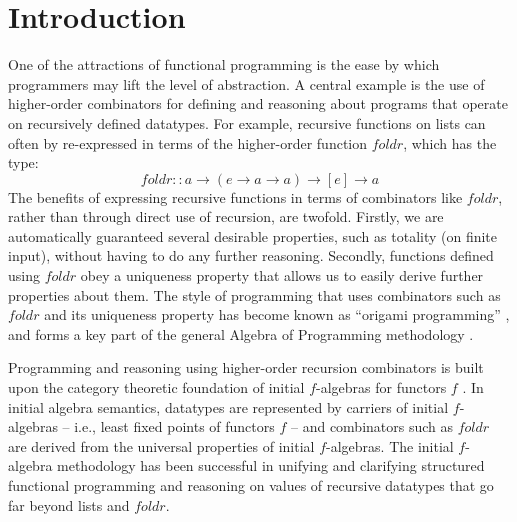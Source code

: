\documentclass{jfp1}
\begin{document}
\section{Introduction}

One of the attractions of functional programming is the ease by which
programmers may lift the level of abstraction. A central example is
the use of higher-order combinators for defining and reasoning about
programs that operate on recursively defined datatypes. For example,
recursive functions on lists can often by re-expressed in terms of the
higher-order function $\mathit{foldr}$, which has the type:
\begin{displaymath}
  \mathit{foldr} :: a \to (e \to a \to a) \to [e] \to a
\end{displaymath}
The benefits of expressing recursive functions in terms of combinators
like $\mathit{foldr}$, rather than through direct use of recursion,
are twofold. Firstly, we are automatically guaranteed several
desirable properties, such as totality (on finite input), without
having to do any further reasoning. Secondly, functions defined using
$\mathit{foldr}$ obey a uniqueness property that allows us to easily
derive further properties about them. The style of
programming that uses combinators such as $\mathit{foldr}$ and its
uniqueness property has become known as ``origami programming''
\cite{gibbons03origami}, and forms a key part of the general Algebra
of Programming methodology \cite{bdm97}.

Programming and reasoning using higher-order recursion combinators is
built upon the category theoretic foundation of initial $f$-algebras
for functors $f$ \cite{GoguenTW78}. In initial algebra semantics,
datatypes are represented by carriers of initial $f$-algebras -- i.e.,
least fixed points of functors $f$ -- and combinators such as
$\mathit{foldr}$ are derived from the universal properties of initial
$f$-algebras. The initial $f$-algebra methodology has been successful
in unifying and clarifying structured functional programming and
reasoning on values of recursive datatypes that go far beyond lists
and $\mathit{foldr}$.
\end{document}
